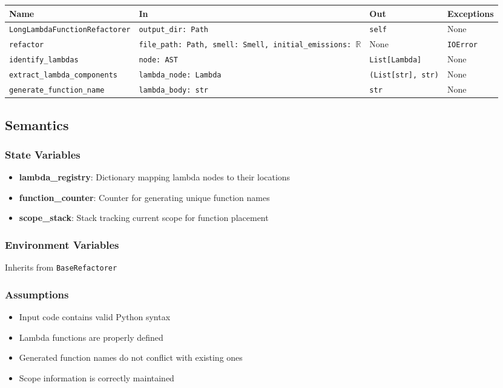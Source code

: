 \documentclass[12pt, titlepage]{article}
\begin{document}
\begin{tabularx}{\linewidth}{|l|>{\raggedright\arraybackslash}X|l|l|}
\hline
\textbf{Name} & \textbf{In} & \textbf{Out} & \textbf{Exceptions} \\\hline
\texttt{LongLambdaFunctionRefactorer} & \texttt{output\_dir: Path} & \texttt{self} & None \\\hline
\texttt{refactor} & \texttt{file\_path: Path, smell: Smell, initial\_emissions: $\mathbb{R}$} & None & \texttt{IOError} \\\hline
\texttt{identify\_lambdas} & \texttt{node: AST} & \texttt{List[Lambda]} & None \\\hline
\texttt{extract\_lambda\_components} & \texttt{lambda\_node: Lambda} & \texttt{(List[str], str)} & None \\\hline
\texttt{generate\_function\_name} & \texttt{lambda\_body: str} & \texttt{str} & None \\\hline
\end{tabularx}

\subsection{Semantics}

\subsubsection{State Variables}
\begin{itemize}
  \item \textbf{lambda\_registry}: Dictionary mapping lambda nodes to their locations
  \item \textbf{function\_counter}: Counter for generating unique function names
  \item \textbf{scope\_stack}: Stack tracking current scope for function placement
\end{itemize}

\subsubsection{Environment Variables}
Inherits from \texttt{BaseRefactorer}

\subsubsection{Assumptions}
\begin{itemize}
  \item Input code contains valid Python syntax
  \item Lambda functions are properly defined
  \item Generated function names do not conflict with existing ones
  \item Scope information is correctly maintained
\end{itemize}
\end{document}
